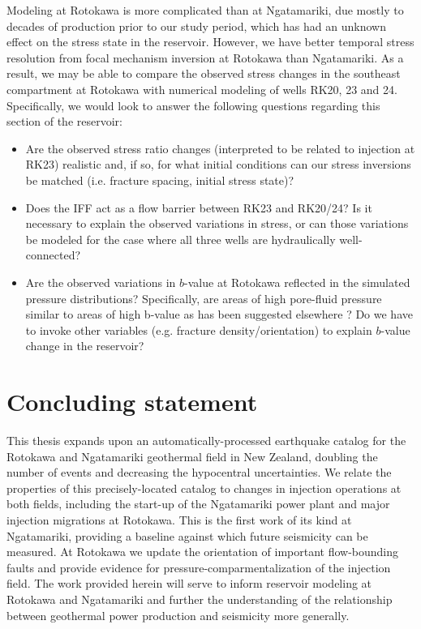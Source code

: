 Modeling at Rotokawa is more complicated than at Ngatamariki, due mostly to decades of production prior to our study period, which has had an unknown effect on the stress state in the reservoir. However, we have better temporal stress resolution from focal mechanism inversion at Rotokawa than Ngatamariki. As a result, we may be able to compare the observed stress changes in the southeast compartment at Rotokawa with numerical modeling of wells RK20, 23 and 24. Specifically, we would look to answer the following questions regarding this section of the reservoir:
\begin{itemize}
    \item Are the observed stress ratio changes (interpreted to be related to injection at RK23) realistic and, if so, for what initial conditions can our stress inversions be matched (i.e. fracture spacing, initial stress state)?
    \item Does the \acrfull{IFF} act as a flow barrier between RK23 and RK20/24? Is it necessary to explain the observed variations in stress, or can those variations be modeled for the case where all three wells are hydraulically well-connected?
    \item Are the observed variations in $b$-value at Rotokawa reflected in the simulated pressure distributions? Specifically, are areas of high pore-fluid pressure similar to areas of high b-value as has been suggested elsewhere \citep{Bachmann_2012}? Do we have to invoke other variables (e.g. fracture density\slash{orientation}) to explain $b$-value change in the reservoir?
\end{itemize}

\section{Concluding statement}
This thesis expands upon an automatically-processed earthquake catalog for the Rotokawa and Ngatamariki geothermal field in New Zealand, doubling the number of events and decreasing the hypocentral uncertainties. We relate the properties of this precisely-located catalog to changes in injection operations at both fields, including the start-up of the Ngatamariki power plant and major injection migrations at Rotokawa. This is the first work of its kind at Ngatamariki, providing a baseline against which future seismicity can be measured. At Rotokawa we update the orientation of important flow-bounding faults and provide evidence for pressure-comparmentalization of the injection field. The work provided herein will serve to inform reservoir modeling at Rotokawa and Ngatamariki and further the understanding of the relationship between geothermal power production and seismicity more generally.